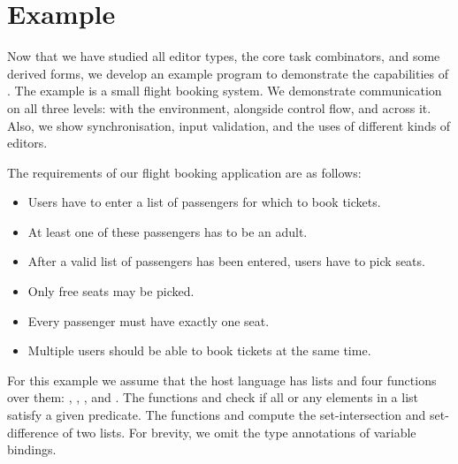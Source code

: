 
\section{Example}

Now that we have studied all editor types, the core task combinators, and some derived forms,
we develop an example program to demonstrate the capabilities of \TOPHAT.
The example is a small flight booking system.
We demonstrate communication on all three levels: with the environment, alongside control flow, and across it.
Also, we show synchronisation, input validation, and the uses of different kinds of editors.


The requirements of our flight booking application are as follows:
\begin{itemize}
  \item Users have to enter a list of passengers for which to book tickets.
  \item At least one of these passengers has to be an adult.
  \item After a valid list of passengers has been entered, users have to pick seats.
  \item Only free seats may be picked.
  \item Every passenger must have exactly one seat.
  \item Multiple users should be able to book tickets at the same time.
\end{itemize}

For this example we assume that the host language has lists and four functions over them:
, , , and .
The functions  and  check if all or any elements in a list satisfy a given predicate.
The functions  and  compute the set-intersection and set-difference of two lists.
For brevity, we omit the type annotations of variable bindings.

